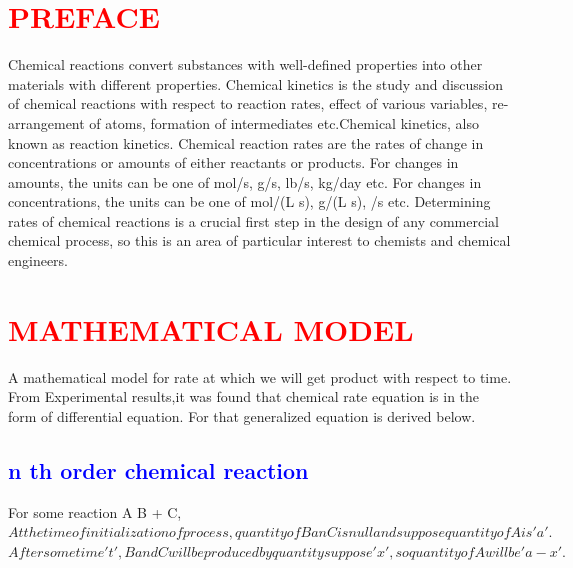 \documentclass[12pt]{article}
\begin{document}
\newpage
\large
\section{\textcolor{red}{PREFACE}}
Chemical reactions convert substances with well-defined properties into other materials with different properties. Chemical kinetics is the study and discussion of chemical reactions with respect to reaction rates, effect of various variables, re-arrangement of atoms, formation of intermediates etc.Chemical kinetics, also known as reaction kinetics. Chemical reaction rates are the rates of change in concentrations or amounts of either reactants or products. For changes in amounts, the units can be one of mol/s, g/s, lb/s, kg/day etc. For changes in concentrations, the units can be one of mol/(L s), g/(L s), /s etc.
        Determining rates of chemical reactions is a crucial first step in the design of any commercial chemical process, so this is an area of particular interest to chemists and chemical engineers.   

\section{\textcolor{red}{ MATHEMATICAL MODEL }}
\textsf
A mathematical model for rate at which we will get product with respect to time. From Experimental results,it was found that chemical rate equation is in the form of differential equation.
For that generalized equation is derived below. 
\subsection{\textcolor{blue}{n th order chemical reaction}}
{
For some reaction {A  \rightarrow  B  +  C},
$At the time of initialization of process, quantity of B an C is null and suppose quantity of A is 'a'.$
\\$After some time 't', B and C will be produced by quantity suppose 'x', so quantity of A will be 'a-x'.$ 
}
\end{document}
